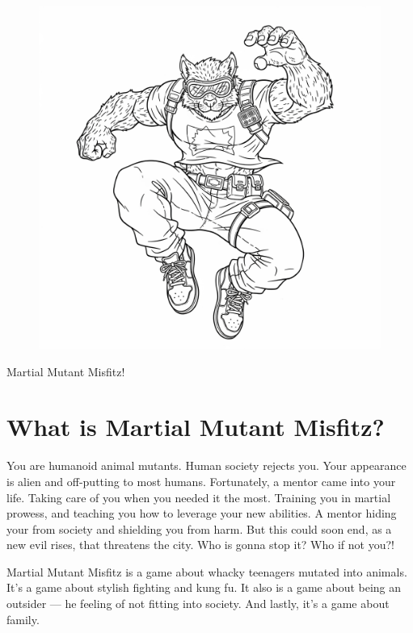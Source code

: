 \documentclass{article}
\begin{document}

\begin{figure}[tph!]
\centering\includegraphics[width=12cm]{images/frontCover.png}
\end{figure}
\Huge{}Martial Mutant Misfitz!

\newpage
{}

\section*{What is Martial Mutant Misfitz?}
\normalfont\normalsize You are humanoid animal mutants. Human society rejects you. Your appearance is alien and off-putting to most humans. Fortunately, a mentor came into your life. Taking care of you when you needed it the most. Training you in martial prowess, and teaching you how to leverage your new abilities. A mentor hiding your from society and shielding you from harm. But this could soon end, as a new evil rises, that threatens the city. Who is gonna stop it? Who if not you?!

Martial Mutant Misfitz is a game about whacky teenagers mutated into animals. It's a game about stylish fighting and kung fu. It also is a game about being an outsider --- he feeling of not fitting into society. And lastly, it's a game about family.
\newpage
{}
\end{document}
